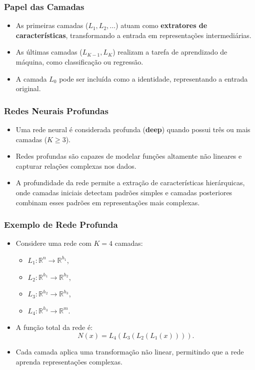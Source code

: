 \documentclass[aspectratio=169]{beamer}
\begin{document}
\begin{frame}
\frametitle{Papel das Camadas}
\begin{itemize}
    \item As primeiras camadas (\( L_1, L_2, \ldots \)) atuam como \textbf{extratores de características}, transformando a entrada em representações intermediárias.
    \item As últimas camadas (\( L_{K-1}, L_K \)) realizam a tarefa de aprendizado de máquina, como classificação ou regressão.
    \item A camada \( L_0 \) pode ser incluída como a identidade, representando a entrada original.
\end{itemize}
\end{frame}

\begin{frame}
\frametitle{Redes Neurais Profundas}
\begin{itemize}
    \item Uma rede neural é considerada profunda (\textbf{deep}) quando possui três ou mais camadas (\( K \geq 3 \)).
    \item Redes profundas são capazes de modelar funções altamente não lineares e capturar relações complexas nos dados.
    \item A profundidade da rede permite a extração de características hierárquicas, onde camadas iniciais detectam padrões simples e camadas posteriores combinam esses padrões em representações mais complexas.
\end{itemize}
\end{frame}

\begin{frame}
\frametitle{Exemplo de Rede Profunda}
\begin{itemize}
    \item Considere uma rede com \( K = 4 \) camadas:
    \begin{itemize}
        \item \( L_1: \mathbb{R}^n \to \mathbb{R}^{h_1} \),
        \item \( L_2: \mathbb{R}^{h_1} \to \mathbb{R}^{h_2} \),
        \item \( L_3: \mathbb{R}^{h_2} \to \mathbb{R}^{h_3} \),
        \item \( L_4: \mathbb{R}^{h_3} \to \mathbb{R}^m \).
    \end{itemize}
    \item A função total da rede é:
    \[
    N(x) = L_4(L_3(L_2(L_1(x)))).
    \]
    \item Cada camada aplica uma transformação não linear, permitindo que a rede aprenda representações complexas.
\end{itemize}
\end{frame}
\end{document}
